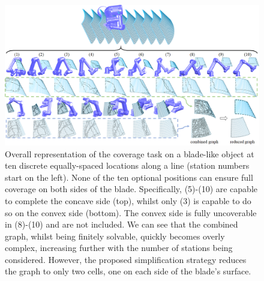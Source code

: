 \documentclass[letterpaper,journal]{IEEEtran}
\begin{document}
\begin{figure}[t]
\centering
\includegraphics[width = \textwidth]{figures/blade_demo/whole_process_2}
\caption{Overall representation of the coverage task on a blade-like object at ten discrete equally-spaced locations along a line (station numbers start on the left). None of the ten optional positions can ensure full coverage on both sides of the blade. Specifically, (5)-(10) are capable to complete the concave side (top), whilst only (3) is capable to do so on the convex side (bottom). The convex side is fully uncoverable in (8)-(10) and are not included. We can see that the combined graph, whilst being finitely solvable, quickly becomes overly complex, increasing further with the number of stations being considered. However, the proposed simplification strategy reduces the graph to only two cells, one on each side of the blade's surface. %
}
\label{fig:whole_process}
\end{figure}
\end{document}
